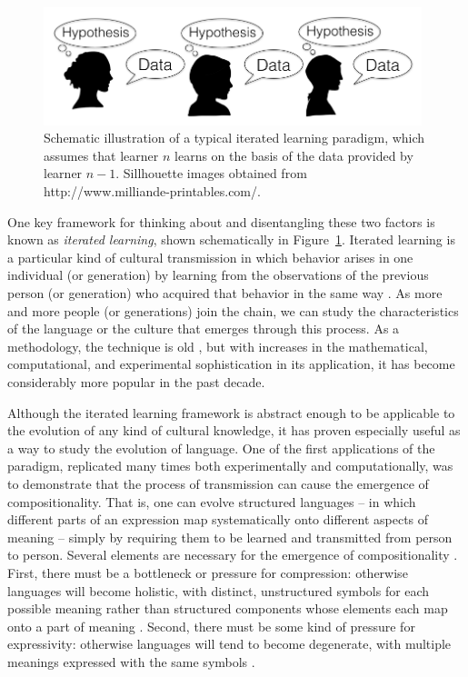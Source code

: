 \documentclass[doc]{apa6}
\begin{document}
\begin{figure}[t]
\begin{center}
\includegraphics[width=11cm]{iteratedlearningschema.png} 
\caption{{\small Schematic illustration of a typical iterated learning paradigm, which assumes that learner $n$ learns on the basis of the data provided by learner $n-1$. Sillhouette images obtained from http://www.milliande-printables.com/.}}
\label{ilschema}
\end{center}
\end{figure}

One key framework for thinking about and disentangling these two factors is known as {\it iterated learning}, shown schematically in Figure~\ref{ilschema}. Iterated learning is a particular kind of cultural transmission in which behavior arises in one individual (or generation) by learning from the observations of the previous person (or generation) who acquired that behavior in the same way \parencite{kirbyetal14}. As more and more people (or generations) join the chain, we can study the characteristics of the language or the culture that emerges through this process. As a methodology, the technique is old \parencite{bartlett32}, but with increases in the mathematical, computational, and experimental sophistication in its application, it has become considerably more popular in the past decade. 

Although the iterated learning framework is abstract enough to be applicable to the evolution of any kind of cultural knowledge, it has proven especially useful as a way to study the evolution of language. One of the first applications of the paradigm, replicated many times both experimentally and computationally, was to demonstrate that the process of transmission can cause the emergence of compositionality. That is, one can evolve structured languages -- in which different parts of an expression map systematically onto different aspects of meaning -- simply by requiring them to be learned and transmitted from person to person. Several elements are necessary for the emergence of compositionality \parencite{kirbyetal15}. First, there must be a bottleneck or pressure for compression: otherwise languages will become holistic, with distinct, unstructured symbols for each possible meaning rather than structured components whose elements each map onto a part of meaning \parencite{kirby00,brightonetal05,fayellison13}. Second, there must be some kind of pressure for expressivity: otherwise languages will tend to become degenerate, with multiple meanings expressed with the same symbols \parencite{kirbyetal08,perforsnavarro14,silveyetal14}. 
\end{document}
